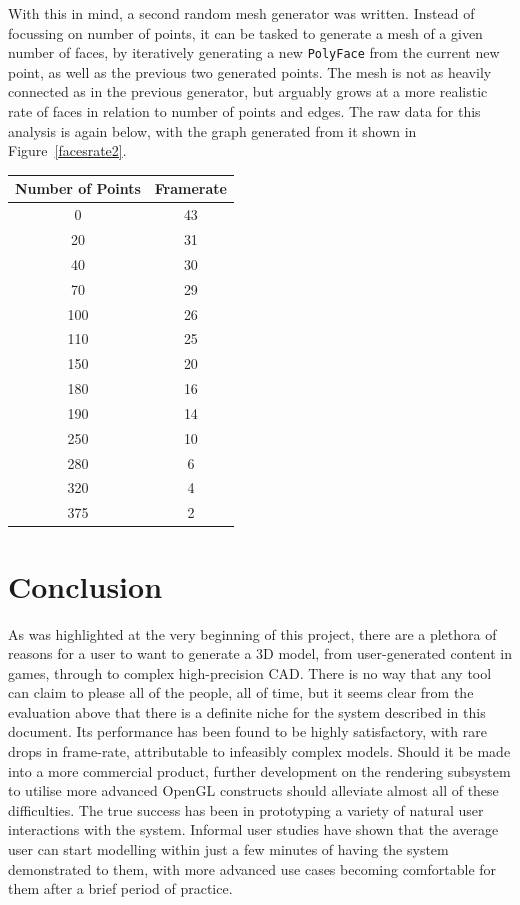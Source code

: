 \documentclass[a4paper,10pt]{report}
\begin{document}
With this in mind, a second random mesh generator was written. Instead of focussing on number of points, it can be tasked to generate a mesh of a given number of faces, by iteratively generating a new \texttt{PolyFace} from the current new point, as well as the previous two generated points. The mesh is not as heavily connected as in the previous generator, but arguably grows at a more realistic rate of faces in relation to number of points and edges. The raw data for this analysis is again below, with the graph generated from it shown in Figure~\ref{facesrate2}.

\begin{center}
\begin{tabular}{| c || c |} 
\hline
\textbf{Number of Points}	& \textbf{Framerate} \\
\hline
\hline
0	& 43 \\
20	& 31 \\
40	& 30 \\
70	& 29 \\
100	& 26 \\
110	& 25 \\
150	& 20 \\
180	& 16 \\
190	& 14 \\
250	& 10 \\
280	& 6 \\
320	& 4 \\
375	& 2 \\
\hline
\end{tabular}
\end{center}

\clearpage

\chapter{Conclusion}
As was highlighted at the very beginning of this project, there are a plethora of reasons for a user to want to generate a 3D model, from user-generated content in games, through to complex high-precision CAD. There is no way that any tool can claim to please all of the people, all of time, but it seems clear from the evaluation above that there is a definite niche for the system described in this document. Its performance has been found to be highly satisfactory, with rare drops in frame-rate, attributable to infeasibly complex models. Should it be made into a more commercial product, further development on the rendering subsystem to utilise more advanced OpenGL constructs should alleviate almost all of these difficulties. The true success has been in prototyping a variety of natural user interactions with the system. Informal user studies have shown that the average user can start modelling within just a few minutes of having the system demonstrated to them, with more advanced use cases becoming comfortable for them after a brief period of practice.
\end{document}
